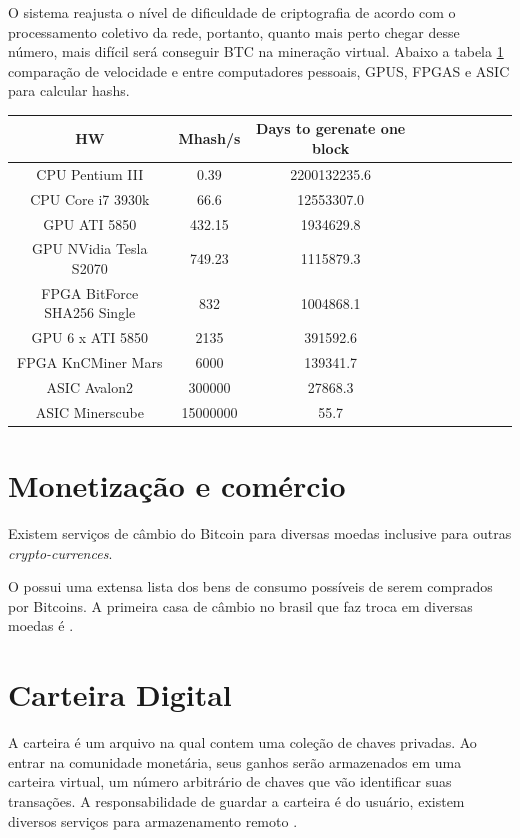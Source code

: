 \documentclass[a4paper,11pt]{article}
\theoremstyle{mytheor}
\begin{document}
O sistema reajusta o nível de dificuldade de criptografia de acordo com o processamento coletivo da rede, portanto, quanto mais perto chegar desse número, mais difícil será conseguir BTC na mineração virtual. Abaixo a tabela \ref{compare} comparação de velocidade e entre computadores pessoais, GPUS, FPGAS e ASIC para calcular hashs.

\begin{table}[!ht]
\centering
\label{compare}
\scriptsize
\begin{tabular}{|c|c|c|c|c|c|c|c|c|c|}
\hline
\textbf{HW} & \textbf{Mhash/s} & \textbf{Days to gerenate one block} \\ \hline
CPU Pentium III & 0.39 & 2200132235.6 \\ \hline
CPU Core i7 3930k & 66.6 & 12553307.0 \\ \hline
GPU ATI 5850 & 432.15 & 1934629.8 \\ \hline
GPU NVidia Tesla S2070 & 749.23 & 1115879.3 \\ \hline
FPGA BitForce SHA256 Single & 832 & 1004868.1 \\ \hline
GPU 6 x ATI 5850 & 2135 & 391592.6 \\ \hline
FPGA KnCMiner Mars & 6000 & 139341.7 \\ \hline
ASIC Avalon2 & 300000 & 27868.3 \\ \hline
ASIC Minerscube & 15000000 & 55.7 \\ \hline  
\end{tabular}
\end{table}


\section*{Monetização e comércio}

Existem serviços de câmbio do Bitcoin para diversas moedas inclusive para outras \textit{crypto-currences}.

O \cite{trade} possui uma extensa lista dos bens de consumo possíveis de serem comprados por Bitcoins. A primeira casa de câmbio no brasil que faz troca em diversas moedas é \cite{primeira}.

\section*{Carteira Digital}
A carteira é um arquivo na qual contem uma coleção de chaves privadas. Ao entrar na comunidade monetária, seus ganhos serão armazenados em uma carteira virtual, um  número arbitrário de chaves que vão identificar suas transações. A responsabilidade de guardar a carteira é do usuário, existem diversos serviços para armazenamento remoto \cite{remoteWallet}.
\end{document}
